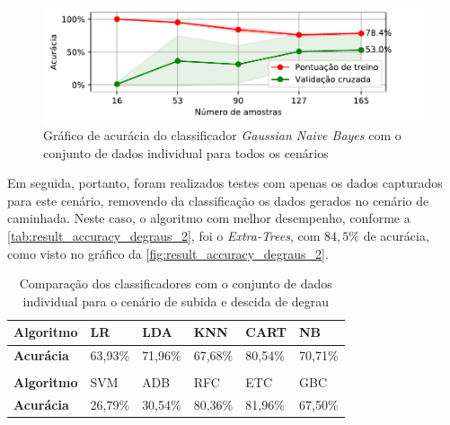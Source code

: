 \begin{figure}[h]
	\caption{\label{fig:result_accuracy_degraus_1}Gráfico de acurácia do classificador \textit{Gaussian Naive Bayes} com o conjunto de dados individual para todos os cenários}
	\begin{center}
	    \includegraphics[width=\textwidth]{resources/result_accuracy_degraus_1}
	\end{center}
\end{figure}
\newpage
Em seguida, portanto, foram realizados testes com apenas os dados capturados para este cenário, removendo da classificação os dados gerados no cenário de caminhada. Neste caso, o algoritmo com melhor desempenho, conforme a \autoref{tab:result_accuracy_degraus_2}, foi o \textit{Extra-Trees}, com \(84{,}5\%\) de acurácia, como visto no gráfico da \autoref{fig:result_accuracy_degraus_2}.

\begin{table}[ht]
\caption{Comparação dos classificadores com o conjunto de dados individual para o cenário de subida e descida de degrau}
\label{tab:result_accuracy_degraus_2}
\begin{tabularx}{\textwidth}{|X|X|X|X|X|X|}
\hline
\textbf{Algoritmo} & LR      & LDA     & KNN     & CART    & NB      \\ \hline
\textbf{Acurácia}  & 63,93\% & 71,96\% & 67,68\% & 80,54\% & 70,71\% \\ \hline
                   &         &         &         &         &         \\ \hline
\textbf{Algoritmo} & SVM     & ADB     & RFC     & ETC     & GBC     \\ \hline
\textbf{Acurácia}  & 26,79\% & 30,54\% & 80,36\% & 81,96\% & 67,50\% \\ \hline
\end{tabularx}
\end{table}

